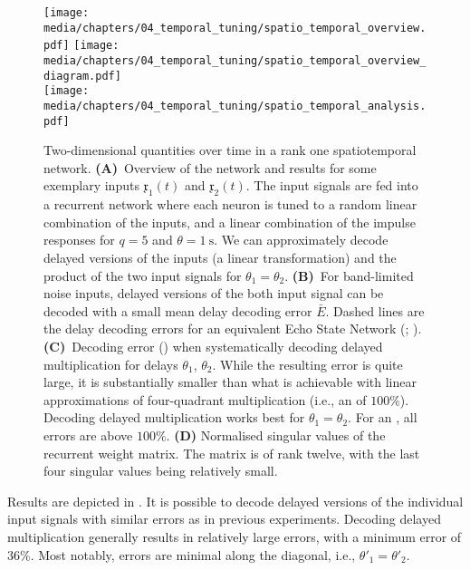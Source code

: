 \begin{figure}
	\centering
	\texttt{[image: media/chapters/04\_temporal\_tuning/spatio\_temporal\_overview.pdf]}%
	\kern-158mm\texttt{[image: media/chapters/04\_temporal\_tuning/spatio\_temporal\_overview\_diagram.pdf]}\\[0.5cm]
	\texttt{[image: media/chapters/04\_temporal\_tuning/spatio\_temporal\_analysis.pdf]}%
	{\label{fig:spatio_temporal_a}}%
	{\label{fig:spatio_temporal_b}}%
	{\label{fig:spatio_temporal_c}}%
	{\label{fig:spatio_temporal_d}}%
	\caption[Two-dimensional quantities over time in a rank one spatiotemporal network]{
		Two-dimensional quantities over time in a rank one spatiotemporal network.
		\textbf{(A)}~Overview of the network and results for some exemplary inputs $\mathfrak{x}_1(t)$ and $\mathfrak{x}_2(t)$.
		The input signals are fed into a recurrent network where each neuron is tuned to a random linear combination of the inputs, and a linear combination of the \LDN impulse responses for $q = 5$ and $\theta = \SI{1}{\second}$.
		We can approximately decode delayed versions of the inputs (a linear transformation) and the product of the two input signals for $\theta_1 = \theta_2$.
		\textbf{(B)}~For band-limited noise inputs, delayed versions of the both input signal can be decoded with a small mean delay decoding error $\bar E$. Dashed lines are the delay decoding errors for an equivalent Echo State Network (\ESN; \cite{jaeger2004harnessing}).
		\textbf{(C)}~Decoding error (\NRMSE) when systematically decoding delayed multiplication for delays $\theta_1$, $\theta_2$.
		While the resulting error is quite large, it is substantially smaller than what is achievable with linear approximations of four-quadrant multiplication (i.e., an \NRMSE of $100\%$). Decoding delayed multiplication works best for $\theta_1 = \theta_2$.
		For an \ESN, all errors are above $100\%$.
		\textbf{(D)} Normalised singular values of the recurrent weight matrix.
		The matrix is of rank twelve, with the last four singular values being relatively small.
	}
	\label{fig:spatio_temporal}
\end{figure}

Results are depicted in .
It is possible to decode delayed versions of the individual input signals with similar errors as in previous experiments.
Decoding delayed multiplication generally results in relatively large errors, with a minimum error of $36\%$.
Most notably, errors are minimal along the diagonal, i.e., $\theta'_1 = \theta'_2$.

